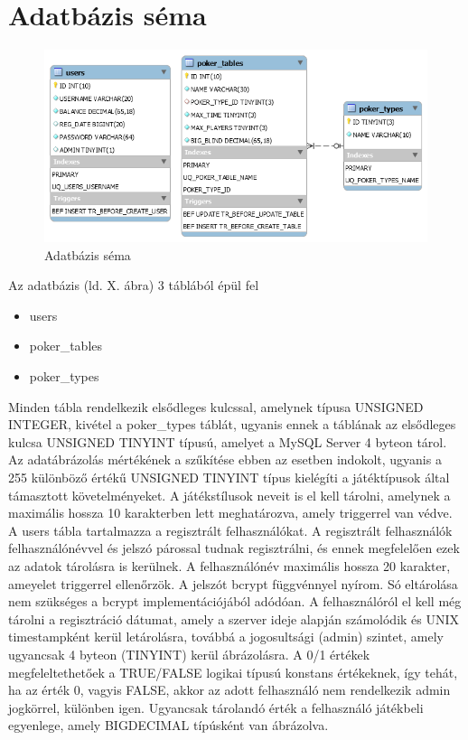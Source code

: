 \section{Adatbázis séma}
\begin{figure}[h!]
  \caption{Adatbázis séma}
  \centering
    \includegraphics[width=\textwidth]{user-documentation/images/db_scheme2.png}
\end{figure}
Az adatbázis (ld. X. ábra) 3 táblából épül fel
\begin{itemize}[leftmargin=2.7cm]
\item users
\item poker\_tables
\item poker\_types
\end{itemize}
 Minden tábla rendelkezik elsődleges kulcssal, amelynek típusa UNSIGNED INTEGER, kivétel a poker\_types táblát, ugyanis ennek a táblának az elsődleges kulcsa UNSIGNED TINYINT típusú, amelyet a MySQL Server 4 byteon tárol. Az adatábrázolás mértékének a szűkítése ebben az esetben indokolt, ugyanis a 255 különböző értékű UNSIGNED TINYINT típus kielégíti a játéktípusok által támasztott követelményeket. A játékstílusok neveit is el kell tárolni, amelynek a maximális hossza 10 karakterben lett meghatározva, amely triggerrel van védve. A users tábla tartalmazza a regisztrált felhasználókat. A regisztrált felhasználók felhasználónévvel és jelszó párossal tudnak regisztrálni, és ennek megfelelően ezek az adatok tárolásra is kerülnek. A felhasználónév maximális hossza 20 karakter, ameyelet triggerrel ellenőrzök. A jelszót bcrypt függvénnyel nyírom. Só eltárolása nem szükséges a bcrypt implementációjából adódóan. A felhasználóról el kell még tárolni a regisztráció dátumat, amely a szerver ideje alapján számolódik és UNIX timestampként kerül letárolásra, továbbá a jogosultsági (admin) szintet, amely ugyancsak 4 byteon (TINYINT) kerül ábrázolásra. A 0/1 értékek megfeleltethetőek a TRUE/FALSE logikai típusú konstans értékeknek, így tehát, ha az érték 0, vagyis FALSE, akkor az adott felhasználó nem rendelkezik admin jogkörrel, különben igen. Ugyancsak tárolandó érték a felhasználó játékbeli egyenlege, amely BIGDECIMAL típúsként van ábrázolva.
